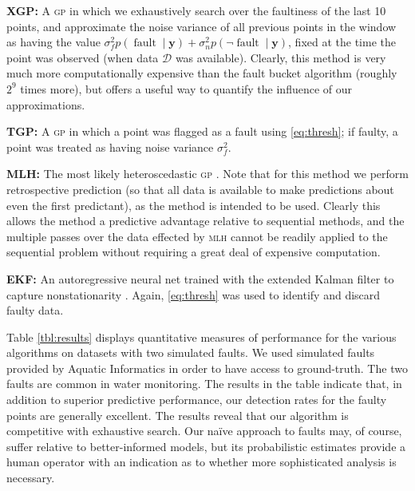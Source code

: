 \documentclass{article}
\newcommand{\given}{\ensuremath{\mid}}
\newcommand{\cm}[1]{\ensuremath{\mathcal{#1}}}
\newcommand{\bm}[1]{\ensuremath{\mathbf{#1}}}
\newcommand{\data}{\ensuremath{\cm{D}}}
\newcommand{\acro}[1]{\textsc{#1}}
\newcommand{\vect}[1]{\bm{#1}}
\newcommand{\vy}{\vect{y}}
\newcommand{\p}[2]{p(#1\given#2)}
\newcommand{\mean}[2]{{m}(#1\given#2)}
\DeclareMathOperator{\fault}{fault}
\begin{document}
{\bf XGP:}
A  \acro{gp} in which we exhaustively search over the faultiness of the last 10 points, and approximate the noise variance of all previous points in the window as having the value $\sigma_f^2 \p{\fault}{\vy} + \sigma_n^2 \p{\neg\fault}{\vy}$, fixed at the time the point was observed (when data $\data$ was available). Clearly, this method is very much more computationally expensive than the fault bucket algorithm (roughly $2^9$ times more), but offers a useful way to quantify the influence of our approximations.

{\bf TGP:}
A \acro{gp} in which a point was flagged as a fault using \eqref{eq:thresh}; if faulty, a point was treated as having noise variance $\sigma_f^2$.


{\bf MLH:} 
The most likely heteroscedastic  \acro{gp} \citep{kersting2007most}. Note that for this method we perform retrospective prediction (so that all data is available to make predictions about even the first predictant), as the method is intended to be used. Clearly this allows the method a predictive advantage relative to sequential methods, and the multiple passes over the data effected by \acro{mlh} cannot be readily applied to the sequential problem without requiring a great deal of expensive computation. 

{\bf EKF:}
An autoregressive neural net trained with the extended Kalman filter to capture nonstationarity \cite{ndfEKF1,ndfEKF2}. Again, \eqref{eq:thresh} was used to identify and discard faulty data.

Table \ref{tbl:results} displays quantitative measures of performance
for the various algorithms on datasets with two simulated faults. We used simulated faults provided by Aquatic Informatics in order to have access to ground-truth. The two faults are common in water monitoring. The results in the table indicate that,
in addition to superior predictive performance, our
detection rates for the faulty points are generally excellent. The results reveal that our algorithm is competitive with exhaustive search. Our na\"{i}ve approach to faults may, of course, suffer relative to better-informed models, but its probabilistic estimates provide a human operator with an indication as to whether more sophisticated analysis is necessary.
\end{document}
